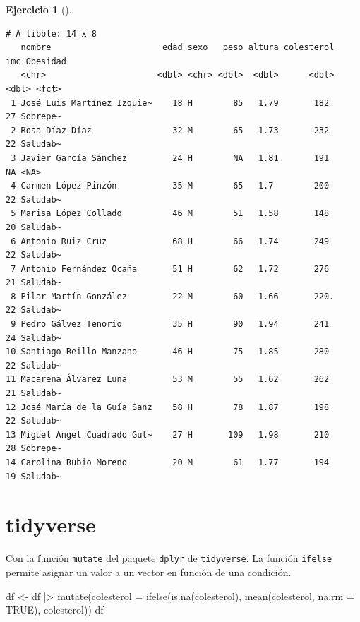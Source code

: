 \documentclass[
  spanish,
  a4paper,
]{scrreport}
\newenvironment{Shaded}{\begin{snugshade}}{\end{snugshade}}
\newcommand{\AttributeTok}[1]{\textcolor[rgb]{0.40,0.45,0.13}{#1}}
\newcommand{\ConstantTok}[1]{\textcolor[rgb]{0.56,0.35,0.01}{#1}}
\newcommand{\FunctionTok}[1]{\textcolor[rgb]{0.28,0.35,0.67}{#1}}
\newcommand{\NormalTok}[1]{\textcolor[rgb]{0.00,0.23,0.31}{#1}}
\newcommand{\OtherTok}[1]{\textcolor[rgb]{0.00,0.23,0.31}{#1}}
\newcommand{\SpecialCharTok}[1]{\textcolor[rgb]{0.37,0.37,0.37}{#1}}
\theoremstyle{definition}
\newtheorem{exercise}{Ejercicio}[chapter]
\theoremstyle{remark}
\begin{document}
\begin{exercise}[]
\begin{enumerate}
\begin{tcolorbox}
\begin{Shaded}
\end{Shaded}

\begin{verbatim}
# A tibble: 14 x 8
   nombre                      edad sexo   peso altura colesterol   imc Obesidad
   <chr>                      <dbl> <chr> <dbl>  <dbl>      <dbl> <dbl> <fct>   
 1 José Luis Martínez Izquie~    18 H        85   1.79       182     27 Sobrepe~
 2 Rosa Díaz Díaz                32 M        65   1.73       232     22 Saludab~
 3 Javier García Sánchez         24 H        NA   1.81       191     NA <NA>    
 4 Carmen López Pinzón           35 M        65   1.7        200     22 Saludab~
 5 Marisa López Collado          46 M        51   1.58       148     20 Saludab~
 6 Antonio Ruiz Cruz             68 H        66   1.74       249     22 Saludab~
 7 Antonio Fernández Ocaña       51 H        62   1.72       276     21 Saludab~
 8 Pilar Martín González         22 M        60   1.66       220.    22 Saludab~
 9 Pedro Gálvez Tenorio          35 H        90   1.94       241     24 Saludab~
10 Santiago Reillo Manzano       46 H        75   1.85       280     22 Saludab~
11 Macarena Álvarez Luna         53 M        55   1.62       262     21 Saludab~
12 José María de la Guía Sanz    58 H        78   1.87       198     22 Saludab~
13 Miguel Angel Cuadrado Gut~    27 H       109   1.98       210     28 Sobrepe~
14 Carolina Rubio Moreno         20 M        61   1.77       194     19 Saludab~
\end{verbatim}

  \section{tidyverse}

  Con la función \texttt{mutate} del paquete \texttt{dplyr} de
  \texttt{tidyverse}. La función \texttt{ifelse} permite asignar un
  valor a un vector en función de una condición.

\begin{Shaded}
\begin{Highlighting}[]
\NormalTok{df }\OtherTok{\textless{}{-}}\NormalTok{ df }\SpecialCharTok{|\textgreater{}}
    \FunctionTok{mutate}\NormalTok{(}\AttributeTok{colesterol =} \FunctionTok{ifelse}\NormalTok{(}\FunctionTok{is.na}\NormalTok{(colesterol), }\FunctionTok{mean}\NormalTok{(colesterol, }\AttributeTok{na.rm =} \ConstantTok{TRUE}\NormalTok{), colesterol))}
\NormalTok{df}
\end{Highlighting}
\end{Shaded}


\end{tcolorbox}
\end{enumerate}
\end{exercise}
\end{document}
